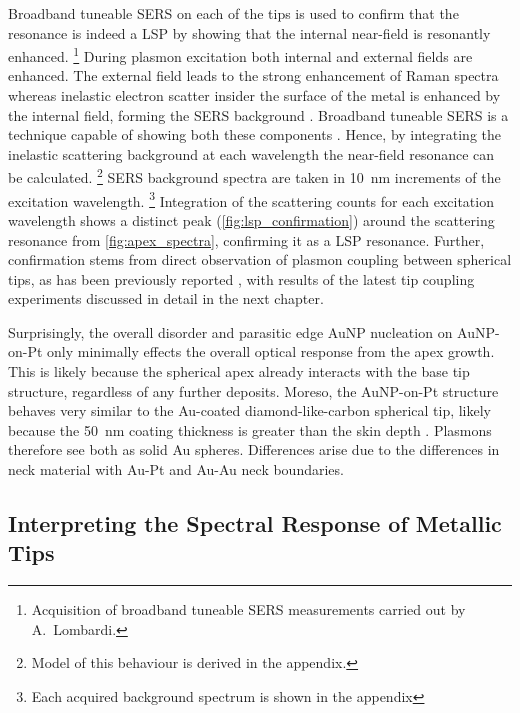 \documentclass{article}
\begin{document}
Broadband tuneable SERS \cite{lombardi2015} on each of the tips is used to confirm that the resonance is indeed a LSP by showing that the internal near-field is resonantly enhanced.%
\footnote{Acquisition of broadband tuneable SERS measurements carried out by A.\ Lombardi.}
During plasmon excitation both internal and external fields are enhanced. The external field leads to the strong enhancement of Raman spectra whereas inelastic electron scatter insider the surface of the metal is enhanced by the internal field, forming the SERS background \cite{hugall2015}. Broadband tuneable SERS is a technique capable of showing both these components \cite{lombardi2015}. Hence, by integrating the inelastic scattering background at each wavelength the near-field resonance can be calculated.%
\footnote{Model of this behaviour is derived in the appendix.}
SERS background spectra are taken in \SI{10}{nm} increments of the excitation wavelength.%
\footnote{Each acquired background spectrum is shown in the appendix}
Integration of the scattering counts for each excitation wavelength shows a distinct peak (\autoref{fig:lsp_confirmation}) around the scattering resonance from \autoref{fig:apex_spectra}, confirming it as a LSP resonance. Further, confirmation stems from direct observation of plasmon coupling between spherical tips, as has been previously reported \cite{savage2012}, with results of the latest tip coupling experiments discussed in detail in the next chapter.

Surprisingly, the overall disorder and parasitic edge AuNP nucleation on AuNP-on-Pt only minimally effects the overall optical response from the apex growth. This is likely because the spherical apex already interacts with the base tip structure, regardless of any further deposits. Moreso, the AuNP-on-Pt structure behaves very similar to the Au-coated diamond-like-carbon spherical tip, likely because the \SI{50}{nm} coating thickness is greater than the skin depth \cite{stockman2011, huber2014}. Plasmons therefore see both as solid Au spheres. Differences arise due to the differences in neck material with Au-Pt and Au-Au neck boundaries.

\FloatBarrier
\subsection{Interpreting the Spectral Response of Metallic Tips}
\end{document}
